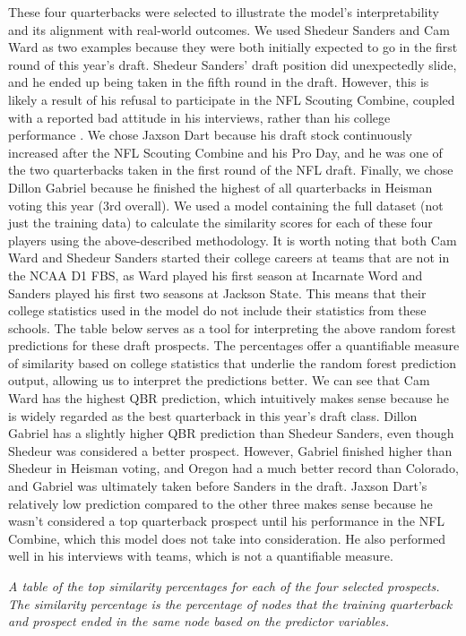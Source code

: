 \documentclass{article}
\begin{document}
These four quarterbacks were selected to illustrate the model's interpretability and its alignment with real-world outcomes. We used Shedeur Sanders and Cam Ward as two examples because they were both initially expected to go in the first round of this year's draft. Shedeur Sanders' draft position did unexpectedly slide, and he ended up being taken in the fifth round in the draft. However, this is likely a result of his refusal to participate in the NFL Scouting Combine, coupled with a reported bad attitude in his interviews, rather than his college performance \citep{mckenna_what_nodate}. We chose Jaxson Dart because his draft stock continuously increased after the NFL Scouting Combine and his Pro Day, and he was one of the two quarterbacks taken in the first round of the NFL draft. Finally, we chose Dillon Gabriel because he finished the highest of all quarterbacks in Heisman voting this year (3rd overall). We used a model containing the full dataset (not just the training data) to calculate the similarity scores for each of these four players using the above-described methodology. It is worth noting that both Cam Ward and Shedeur Sanders started their college careers at teams that are not in the NCAA D1 FBS, as Ward played his first season at Incarnate Word and Sanders played his first two seasons at Jackson State. This means that their college statistics used in the model do not include their statistics from these schools. The table below serves as a tool for interpreting the above random forest predictions for these draft prospects. The percentages offer a quantifiable measure of similarity based on college statistics that underlie the random forest prediction output, allowing us to interpret the predictions better. We can see that Cam Ward has the highest QBR prediction, which intuitively makes sense because he is widely regarded as the best quarterback in this year's draft class. Dillon Gabriel has a slightly higher QBR prediction than Shedeur Sanders, even though Shedeur was considered a better prospect. However, Gabriel finished higher than Shedeur in Heisman voting, and Oregon had a much better record than Colorado, and Gabriel was ultimately taken before Sanders in the draft. Jaxson Dart's relatively low prediction compared to the other three makes sense because he wasn't considered a top quarterback prospect until his performance in the NFL Combine, which this model does not take into consideration. He also performed well in his interviews with teams, which is not a quantifiable measure.

\begin{table}[H]
\resizebox{\textwidth}{!}{
  }
  \caption{\textit{A table of the top similarity percentages for each of the four selected prospects. The similarity percentage is the percentage of nodes that the training quarterback and prospect ended in the same node based on the predictor variables.}}
\end{table}
\end{document}
